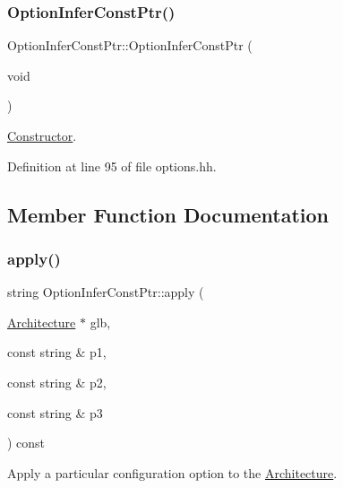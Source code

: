 \subsubsection{\texorpdfstring{OptionInferConstPtr()}{OptionInferConstPtr()}}
{\footnotesize\ttfamily Option\+Infer\+Const\+Ptr\+::\+Option\+Infer\+Const\+Ptr (\begin{DoxyParamCaption}\item[{void}]{ }\end{DoxyParamCaption})\hspace{0.3cm}{\ttfamily [inline]}}



\mbox{\hyperlink{class_constructor}{Constructor}}. 



Definition at line 95 of file options.\+hh.



\subsection{Member Function Documentation}
\mbox{\label{class_option_infer_const_ptr_adc43210baf04d8e5fe13977502f56a69}} 
\subsubsection{\texorpdfstring{apply()}{apply()}}
{\footnotesize\ttfamily string Option\+Infer\+Const\+Ptr\+::apply (\begin{DoxyParamCaption}\item[{\mbox{\hyperlink{class_architecture}{Architecture}} $\ast$}]{glb,  }\item[{const string \&}]{p1,  }\item[{const string \&}]{p2,  }\item[{const string \&}]{p3 }\end{DoxyParamCaption}) const\hspace{0.3cm}{\ttfamily [virtual]}}



Apply a particular configuration option to the \mbox{\hyperlink{class_architecture}{Architecture}}. 

